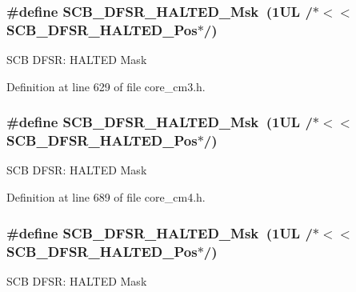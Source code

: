 \subsubsection[{\texorpdfstring{S\+C\+B\+\_\+\+D\+F\+S\+R\+\_\+\+H\+A\+L\+T\+E\+D\+\_\+\+Msk}{SCB_DFSR_HALTED_Msk}}]{\setlength{\rightskip}{0pt plus 5cm}\#define S\+C\+B\+\_\+\+D\+F\+S\+R\+\_\+\+H\+A\+L\+T\+E\+D\+\_\+\+Msk~(1\+U\+L /$\ast$$<$$<$ S\+C\+B\+\_\+\+D\+F\+S\+R\+\_\+\+H\+A\+L\+T\+E\+D\+\_\+\+Pos$\ast$/)}\hypertarget{group___c_m_s_i_s___s_c_b_ga200bcf918d57443b5e29e8ce552e4bdf}{}\label{group___c_m_s_i_s___s_c_b_ga200bcf918d57443b5e29e8ce552e4bdf}
S\+CB D\+F\+SR\+: H\+A\+L\+T\+ED Mask 

Definition at line 629 of file core\+\_\+cm3.\+h.

\subsubsection[{\texorpdfstring{S\+C\+B\+\_\+\+D\+F\+S\+R\+\_\+\+H\+A\+L\+T\+E\+D\+\_\+\+Msk}{SCB_DFSR_HALTED_Msk}}]{\setlength{\rightskip}{0pt plus 5cm}\#define S\+C\+B\+\_\+\+D\+F\+S\+R\+\_\+\+H\+A\+L\+T\+E\+D\+\_\+\+Msk~(1\+U\+L /$\ast$$<$$<$ S\+C\+B\+\_\+\+D\+F\+S\+R\+\_\+\+H\+A\+L\+T\+E\+D\+\_\+\+Pos$\ast$/)}\hypertarget{group___c_m_s_i_s___s_c_b_ga200bcf918d57443b5e29e8ce552e4bdf}{}\label{group___c_m_s_i_s___s_c_b_ga200bcf918d57443b5e29e8ce552e4bdf}
S\+CB D\+F\+SR\+: H\+A\+L\+T\+ED Mask 

Definition at line 689 of file core\+\_\+cm4.\+h.

\subsubsection[{\texorpdfstring{S\+C\+B\+\_\+\+D\+F\+S\+R\+\_\+\+H\+A\+L\+T\+E\+D\+\_\+\+Msk}{SCB_DFSR_HALTED_Msk}}]{\setlength{\rightskip}{0pt plus 5cm}\#define S\+C\+B\+\_\+\+D\+F\+S\+R\+\_\+\+H\+A\+L\+T\+E\+D\+\_\+\+Msk~(1\+U\+L /$\ast$$<$$<$ S\+C\+B\+\_\+\+D\+F\+S\+R\+\_\+\+H\+A\+L\+T\+E\+D\+\_\+\+Pos$\ast$/)}\hypertarget{group___c_m_s_i_s___s_c_b_ga200bcf918d57443b5e29e8ce552e4bdf}{}\label{group___c_m_s_i_s___s_c_b_ga200bcf918d57443b5e29e8ce552e4bdf}
S\+CB D\+F\+SR\+: H\+A\+L\+T\+ED Mask 

